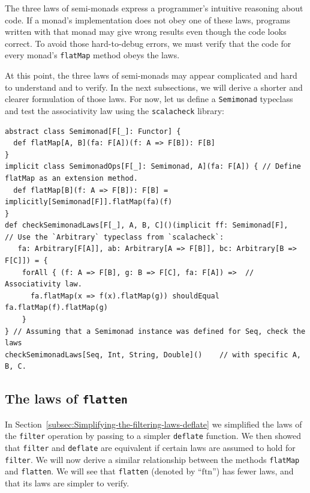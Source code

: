 The three laws of semi-monads express a programmer\textsf{'}s intuitive reasoning
about code. If a monad\textsf{'}s implementation does not obey one of these
laws, programs written with that monad may give wrong results even
though the code looks correct. To avoid those hard-to-debug errors,
we must verify that the code for every monad\textsf{'}s \lstinline!flatMap!
method obeys the laws. 

At this point, the three laws of semi-monads may appear complicated
and hard to understand and to verify. In the next subsections, we
will derive a shorter and clearer formulation of those laws. For now,
let us define a \lstinline!Semimonad! typeclass
and test the associativity law using the \lstinline!scalacheck! library:
\begin{lstlisting}
abstract class Semimonad[F[_]: Functor] {
  def flatMap[A, B](fa: F[A])(f: A => F[B]): F[B]
}
implicit class SemimonadOps[F[_]: Semimonad, A](fa: F[A]) { // Define flatMap as an extension method.
  def flatMap[B](f: A => F[B]): F[B] = implicitly[Semimonad[F]].flatMap(fa)(f)
}
def checkSemimonadLaws[F[_], A, B, C]()(implicit ff: Semimonad[F],   // Use the `Arbitrary` typeclass from `scalacheck`:
   fa: Arbitrary[F[A]], ab: Arbitrary[A => F[B]], bc: Arbitrary[B => F[C]]) = {
    forAll { (f: A => F[B], g: B => F[C], fa: F[A]) =>  // Associativity law.
      fa.flatMap(x => f(x).flatMap(g)) shouldEqual fa.flatMap(f).flatMap(g)
    }
} // Assuming that a Semimonad instance was defined for Seq, check the laws
checkSemimonadLaws[Seq, Int, String, Double]()    // with specific A, B, C.
\end{lstlisting}


\subsection{The laws of \texttt{flatten}}

In Section~\ref{subsec:Simplifying-the-filtering-laws-deflate} we
simplified the laws of the \lstinline!filter! operation by passing
to a simpler \lstinline!deflate! function. We then showed that \lstinline!filter!
and \lstinline!deflate! are equivalent if certain laws are assumed
to hold for \lstinline!filter!. We will now derive a similar relationship
between the methods \lstinline!flatMap! and \lstinline!flatten!.
We will see that \lstinline!flatten! (denoted by \textsf{``}$\text{ftn}$\textsf{''})
has fewer laws, and that its laws are simpler to verify.

